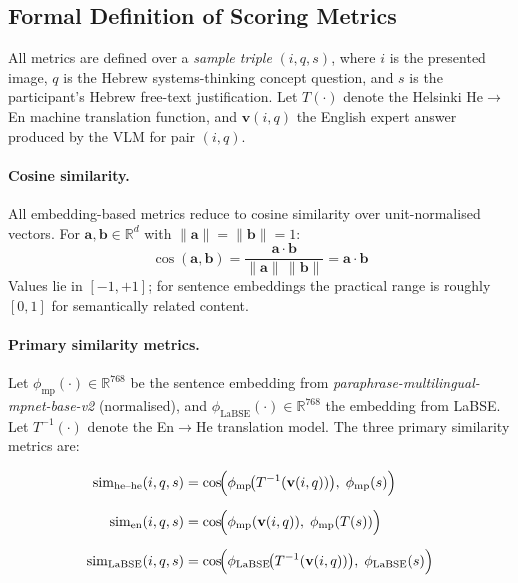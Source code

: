 \documentclass[12pt,a4paper]{article}
\newcommand{\simEN}{\ensuremath{\mathrm{sim}_{\text{en}}}}
\newcommand{\simHH}{\ensuremath{\mathrm{sim}_{\text{he--he}}}}
\newcommand{\simLaBSE}{\ensuremath{\mathrm{sim}_{\text{LaBSE}}}}
\begin{document}
\subsection{Formal Definition of Scoring Metrics}
\label{sec:metrics}

All metrics are defined over a \emph{sample triple} $(i, q, s)$, where $i$ is the
presented image, $q$ is the Hebrew systems-thinking concept question, and $s$ is the
participant's Hebrew free-text justification.
Let $T(\cdot)$ denote the Helsinki He$\to$En machine translation function, and
$\mathbf{v}(i,q)$ the English expert answer produced by the VLM for pair $(i,q)$.

\paragraph{Cosine similarity.}
All embedding-based metrics reduce to cosine similarity over unit-normalised vectors.
For $\mathbf{a}, \mathbf{b} \in \mathbb{R}^{d}$ with $\|\mathbf{a}\|=\|\mathbf{b}\|=1$:
\begin{equation}
  \cos(\mathbf{a}, \mathbf{b})
    = \frac{\mathbf{a} \cdot \mathbf{b}}{\|\mathbf{a}\|\,\|\mathbf{b}\|}
    = \mathbf{a} \cdot \mathbf{b}
  \label{eq:cosine}
\end{equation}
Values lie in $[-1,+1]$; for sentence embeddings the practical range is roughly
$[0, 1]$ for semantically related content.

\paragraph{Primary similarity metrics.}
Let $\phi_{\text{mp}}(\cdot) \in \mathbb{R}^{768}$ be the sentence embedding from
\textit{paraphrase-multilingual-mpnet-base-v2} (normalised), and
$\phi_{\text{LaBSE}}(\cdot) \in \mathbb{R}^{768}$ the embedding from LaBSE.
Let $T^{-1}(\cdot)$ denote the En$\to$He translation model.
The three primary similarity metrics are:

\begin{align}
  \simHH{}(i,q,s)
    &= \cos\!\Bigl(\phi_{\text{mp}}\!\bigl(T^{-1}(\mathbf{v}(i,q))\bigr),\;
                   \phi_{\text{mp}}(s)\Bigr)
    \label{eq:simhh} \\[6pt]
  \simEN{}(i,q,s)
    &= \cos\!\Bigl(\phi_{\text{mp}}(\mathbf{v}(i,q)),\;
                   \phi_{\text{mp}}(T(s))\Bigr)
    \label{eq:simen} \\[6pt]
  \simLaBSE{}(i,q,s)
    &= \cos\!\Bigl(\phi_{\text{LaBSE}}\!\bigl(T^{-1}(\mathbf{v}(i,q))\bigr),\;
                   \phi_{\text{LaBSE}}(s)\Bigr)
    \label{eq:simlabse}
\end{align}
\end{document}
